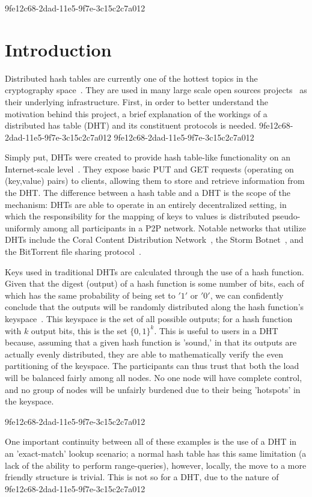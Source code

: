 \documentclass[12pt]{article}
\begin{document}
9fe12c68-2dad-11e5-9f7e-3c15c2c7a012\section{Introduction}
\par Distributed hash tables are currently one of the hottest topics in the cryptography space~\cite{Stoica:2001dj,Rowstron:2001ea,Ratnasamy:2001wn}. They are used in many large scale open sources projects~\cite{Freitas:2013tb,Xu:2010vs,Perfitt:2010fh} as their underlying infrastructure. First, in order to better understand the motivation behind this project, a brief explanation of the workings of a distributed has table (DHT) and its constituent protocols is needed.
9fe12c68-2dad-11e5-9f7e-3c15c2c7a012
9fe12c68-2dad-11e5-9f7e-3c15c2c7a012\par Simply put, DHTs were created to provide hash table-like functionality on an Internet-scale level~\cite{Ratnasamy:2001wn}. They expose basic PUT and GET requests (operating on (key,value) pairs) to clients, allowing them to store and retrieve information from the DHT. The difference between a hash table and a DHT is the scope of the mechanism: DHTs are able to operate in an entirely decentralized setting, in which the responsibility for the mapping of keys to values is distributed pseudo-uniformly among all participants in a P2P network. Notable networks that utilize DHTs include the Coral Content Distribution Network~\cite{Freedman:2004vb}, the Storm Botnet~\cite{Holz:2008uk}, and the BitTorrent file sharing protocol~\cite{Cohen:y1_8mBnw}.

\par Keys used in traditional DHTs are calculated through the use of a hash function. Given that the digest (output) of a hash function is some number of bits, each of which has the same probability of being set to $'1'$ or $'0'$, we can confidently conclude that the outputs will be randomly distributed along the hash function's keyspace~. This keyspace is the set of all possible outputs; for a hash function with $k$ output bits, this is the set $\{0,1\}^k$. This is useful to users in a DHT because, assuming that a given hash function is 'sound,' in that its outputs are actually evenly distributed, they are able to mathematically verify the even partitioning of the keyspace. The participants can thus trust that both the load will be balanced fairly among all nodes. No one node will have complete control, and no group of nodes will be unfairly burdened due to their being 'hotspots' in the keyspace.~

9fe12c68-2dad-11e5-9f7e-3c15c2c7a012\par One important continuity between all of these examples is the use of a DHT in an 'exact-match' lookup scenario; a normal hash table has this same limitation (a lack of the ability to perform range-queries), however, locally, the move to a more friendly structure is trivial. This is not so for a DHT, due to the nature of
9fe12c68-2dad-11e5-9f7e-3c15c2c7a012\printbibliography
\end{document}
